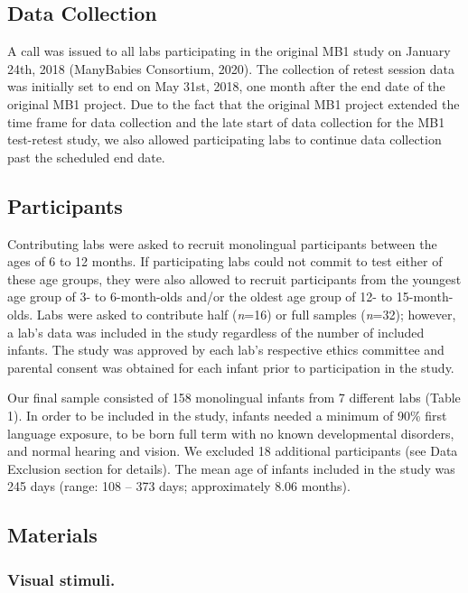 \documentclass[
  english,
  man,floatsintext]{apa6}
\begin{document}
\hypertarget{data-collection}{%
\subsection{Data Collection}\label{data-collection}}

A call was issued to all labs participating in the original MB1 study on January 24th, 2018 (ManyBabies Consortium, 2020). The collection of retest session data was initially set to end on May 31st, 2018, one month after the end date of the original MB1 project. Due to the fact that the original MB1 project extended the time frame for data collection and the late start of data collection for the MB1 test-retest study, we also allowed participating labs to continue data collection past the scheduled end date.

\hypertarget{participants}{%
\subsection{Participants}\label{participants}}

Contributing labs were asked to recruit monolingual participants between the ages of 6 to 12 months. If participating labs could not commit to test either of these age groups, they were also allowed to recruit participants from the youngest age group of 3- to 6-month-olds and/or the oldest age group of 12- to 15-month-olds.
Labs were asked to contribute half (\emph{n}=16) or full samples (\emph{n}=32); however, a lab's data was included in the study regardless of the number of included infants.
The study was approved by each lab's respective ethics committee and parental consent was obtained for each infant prior to participation in the study.

Our final sample consisted of 158 monolingual infants from 7 different labs (Table 1).
In order to be included in the study, infants needed a minimum of 90\% first language exposure, to be born full term with no known developmental disorders, and normal hearing and vision.
We excluded 18 additional participants (see Data Exclusion section for details).
The mean age of infants included in the study was 245 days (range: 108 -- 373 days; approximately 8.06 months).

\hypertarget{materials}{%
\subsection{Materials}\label{materials}}

\hypertarget{visual-stimuli.}{%
\subsubsection{Visual stimuli.}\label{visual-stimuli.}}
\end{document}
